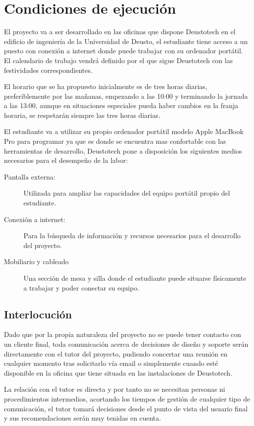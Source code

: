 \documentclass{DeustoFDP}
\begin{document}
\chapter{Condiciones de ejecución}
El proyecto va a ser desarrollado en las oficinas que dispone Deustotech en el edificio de ingeniería de la Universidad de Deusto, el estudiante tiene acceso a un puesto con conexión a internet donde puede trabajar con su ordenador portátil. El calendario de trabajo vendrá definido por el que sigue Deustotech con las festividades correspondientes.

El horario que se ha propuesto inicialmente es de tres horas diarias, preferiblemente por las mañanas, empezando a las 10:00 y terminando la jornada a las 13:00, aunque en situaciones especiales pueda haber cambios en la franja horaria, se respetarán siempre las tres horas diarias.

El estudiante va a utilizar su propio ordenador portátil modelo Apple MacBook Pro para programar ya que es donde se encuentra mas confortable con las herramientas de desarrollo, Deustotech pone a disposición  los siguientes medios necesarios para el desempeño de la labor:
\begin{description}
	\item[Pantalla externa:] Utilizada para ampliar las capacidades del equipo portátil propio del estudiante.
	\item[Conexión a internet:] Para la búsqueda de información y recursos necesarios para el desarrollo del proyecto.
	\item[Mobiliario y cableado] Una sección de mesa y silla donde el estudiante puede situarse físicamente a trabajar y poder conectar su equipo.
\end{description}

\section{Interlocución}
Dado que por la propia naturaleza del proyecto no se puede tener contacto con un cliente final, toda comunicación acerca de decisiones de diseño y soporte serán directamente con el tutor del proyecto, pudiendo concertar una reunión en cualquier momento tras solicitarlo vía email o simplemente cuando esté disponible en la oficina que tiene situada en las instalaciones de Deustotech.

La relación con el tutor es directa y por tanto no se necesitan personas ni procedimientos intermedios, acortando los tiempos de gestión de cualquier tipo de comunicación, el tutor tomará decisiones desde el punto de vista del usuario final y sus recomendaciones serán muy tenidas en cuenta.
\end{document}
